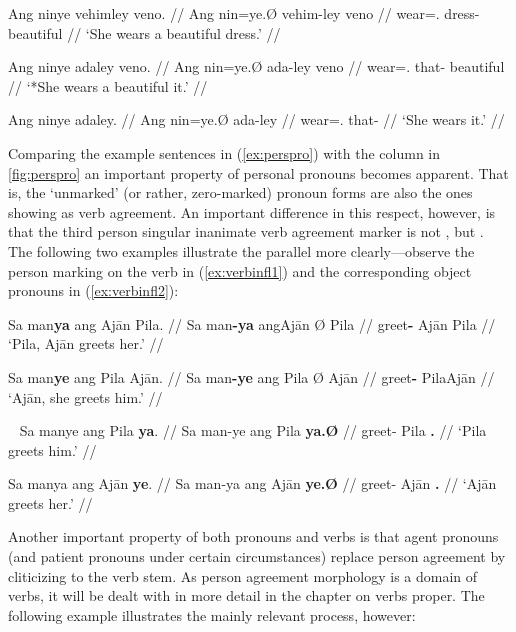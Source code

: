\pex\label{ex:procompldist}
\a\begingl
	\gla Ang ninye vehimley veno. //
	\glb Ang nin=ye.Ø vehim-ley veno //
	\glc \Aarg{} wear=\TsgF{}.\Top{} dress-\PargI{} beautiful //
	\glft `She wears a beautiful dress.' //
\endgl

\a\ljudge* \begingl
	\gla Ang ninye adaley veno. //
	\glb Ang nin=ye.Ø ada-ley veno //
	\glc \Aarg{} wear=\TsgF{}.\Top{} that-\PargI{} beautiful //
	\glft `*She wears a beautiful it.' //
\endgl

\a\begingl
	\gla Ang ninye adaley. //
	\glb Ang nin=ye.Ø ada-ley //
	\glc \Aarg{} wear=\TsgF{}.\Top{} that-\PargI{} //
	\glft `She wears it.' //
\endgl

\xe

Comparing the example sentences in (\ref{ex:perspro}) with the \Top{} column in 
\autoref{fig:perspro} an important property of personal pronouns becomes 
apparent. That is, the `unmarked' (or rather, zero-marked) pronoun forms are 
also the ones showing as verb agreement. An important difference in this 
respect, however, is that the third person singular inanimate verb agreement 
marker is not , but . The following two examples 
illustrate the parallel more clearly---observe the person marking on the verb 
in (\ref{ex:verbinfl1}) and the corresponding object pronouns in 
(\ref{ex:verbinfl2}):

\pex\label{ex:verbinfl1}
\a\begingl
	\gla Sa man\textbf{ya} ang Ajān {} Pila. //
	\glb Sa man\textbf{-ya} ang ​Ajān Ø ​Pila //
	\glc \PatT{} greet\textbf{-\TsgM{}} \Aarg{} ​Ajān \Top{} ​Pila //
	\glft `Pila, Ajān greets her.' //
\endgl

\a\begingl
	\gla Sa man\textbf{ye} ang Pila {} Ajān. //
	\glb Sa man\textbf{-ye} ang Pila Ø ​Ajān //
	\glc \PatT{} greet\textbf{-\TsgF{}} \Aarg{} Pila \Top{} ​Ajān //
	\glft `Ajān, she greets him.' //
\endgl

\xe

\pex~\label{ex:verbinfl2}
\a\begingl
	\gla Sa manye ang Pila \textbf{ya}. //
	\glb Sa man-ye ang Pila \textbf{ya.Ø} //
	\glc \PatT{} greet-\TsgF{} \Aarg{} Pila \textbf{\TsgM{}.\Top{}} //
	\glft `Pila greets him.' //
\endgl

\a\begingl
	\gla Sa manya ang Ajān \textbf{ye}. //
	\glb Sa man-ya ang ​Ajān \textbf{ye.Ø} //
	\glc \PatT{} greet-\TsgM{} \Aarg{} ​Ajān \textbf{\TsgF{}.\Top{}} //
	\glft `Ajān greets her.' //
\endgl

\xe

Another important property of both pronouns and verbs is that agent pronouns 
(and patient pronouns under certain circumstances) replace person agreement by 
cliticizing to the verb stem. As person agreement morphology is a domain of 
verbs, it will be dealt with in more detail in the chapter on verbs proper. The 
following example illustrates the mainly relevant process, however:

